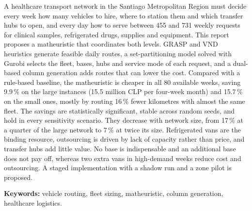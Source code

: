 A healthcare transport network in the Santiago Metropolitan Region must decide every week how many vehicles to hire, where to station them and which transfer hubs to open, and every day how to serve between 455 and 731 weekly requests for clinical samples, refrigerated drugs, supplies and equipment. This report proposes a matheuristic that coordinates both levels. GRASP and VND heuristics generate feasible daily routes, a set-partitioning model solved with Gurobi selects the fleet, bases, hubs and service mode of each request, and a dual-based column generation adds routes that can lower the cost. Compared with a rule-based baseline, the matheuristic is cheaper in all 80 available weeks, saving 9.9\,\% on the large instances (15.5 million CLP per four-week month) and 15.7\,\% on the small ones, mostly by routing 16\,\% fewer kilometres with almost the same fleet. The savings are statistically significant, stable across random seeds, and hold in every sensitivity scenario. They decrease with network size, from 17\,\% at a quarter of the large network to 7\,\% at twice its size. Refrigerated vans are the binding resource, outsourcing is driven by lack of capacity rather than price, and transfer hubs add little value. No base is indispensable and an additional base does not pay off, whereas two extra vans in high-demand weeks reduce cost and outsourcing. A staged implementation with a shadow run and a zone pilot is proposed.

\vspace{0.5em}
\noindent\textbf{Keywords:} vehicle routing, fleet sizing, matheuristic, column generation, healthcare logistics.

